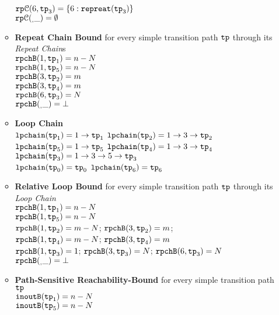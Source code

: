 \begin{enumerate}
\begin{itemize}
    $\mathtt{rp}\mathcal{C}(6, \mathtt{tp}_3) = \{6: \mathtt{repreat}(\mathtt{tp}_3)\}$
    \\
    $\mathtt{rp}\mathcal{C}(_, \_) = \emptyset$ 
    \item \textbf{Repeat Chain Bound} for every simple transition path $\mathtt{tp}$ through its \emph{Repeat Chain}s
    \\
    $\mathtt{rpchB}(1, \mathtt{tp}_1) = n - N$ \\
    $\mathtt{rpchB}(1, \mathtt{tp}_5) = n - N$ \\
    $\mathtt{rpchB}(3, \mathtt{tp}_2) = m$ \\
    $\mathtt{rpchB}(3, \mathtt{tp}_4) = m$ \\
    $\mathtt{rpchB}(6, \mathtt{tp}_3) = N$ \\
    $\mathtt{rpchB}(_, \_) = \bot $ 
    \item \textbf{Loop Chain}
    \\
    $\mathtt{lpchain}(\mathtt{tp}_1) = 1\to \mathtt{tp}_1$ \quad
    $\mathtt{lpchain}(\mathtt{tp}_2) = 1 \to 3 \to \mathtt{tp}_2$ \\
    $\mathtt{lpchain}(\mathtt{tp}_5) = 1\to \mathtt{tp}_5$ \quad
    $\mathtt{lpchain}(\mathtt{tp}_4) = 1 \to 3 \to \mathtt{tp}_4$ \\
    \highlight
    {$\mathtt{lpchain}(\mathtt{tp}_3) = 1 \to 3 \to 5 \to \mathtt{tp}_3$ }\\
    $\mathtt{lpchain}(\mathtt{tp}_0) = \mathtt{tp}_0$ \quad
    $\mathtt{lpchain}(\mathtt{tp}_6) = \mathtt{tp}_6$ 
      \item \textbf{{Relative Loop Bound}} for every simple transition path $\mathtt{tp}$ through its \emph{Loop Chain}
    \\
    $\mathtt{rpchB}(1, \mathtt{tp}_1) = n - N$ \\
    $\mathtt{rpchB}(1, \mathtt{tp}_5) = n - N$ \\
    $\mathtt{rpchB}(1, \mathtt{tp}_2) = m - N$;  $\mathtt{rpchB}(3, \mathtt{tp}_2) = m$; \\
    $\mathtt{rpchB}(1, \mathtt{tp}_4) = m - N$; $\mathtt{rpchB}(3, \mathtt{tp}_4) = m$ \\
    $\mathtt{rpchB}(1, \mathtt{tp}_3) = 1$; $\mathtt{rpchB}(3, \mathtt{tp}_3) = N$; $\mathtt{rpchB}(6, \mathtt{tp}_3) = N$ \\
    $\mathtt{rpchB}(_, \_) = \bot $ 
    \item \textbf{Path-Sensitive Reachability-Bound} for every simple transition path $\mathtt{tp}$
    \\
    $\mathtt{inoutB}(\mathtt{tp}_1) = n - N$ \\
    $\mathtt{inoutB}(\mathtt{tp}_5) = n - N$ \\

\end{itemize}
\end{enumerate}
